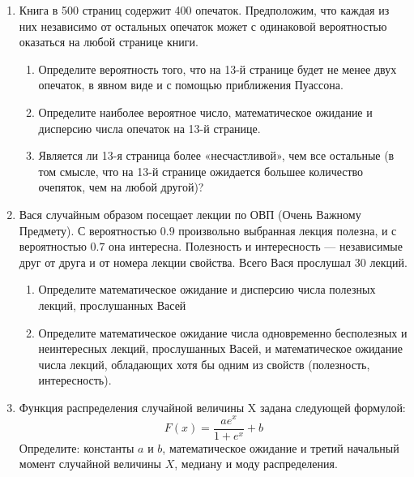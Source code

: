 \begin{enumerate}
\item Книга в 500 страниц содержит 400 опечаток. Предположим, что каждая из них
независимо от остальных опечаток может с одинаковой вероятностью оказаться на любой
странице книги.
\begin{enumerate}
\item Определите вероятность того, что на 13-й странице будет не менее двух опечаток,
в явном виде и с помощью приближения Пуассона.
\item Определите наиболее вероятное число, математическое ожидание и дисперсию
числа опечаток на 13-й странице.
\item Является ли 13-я страница более «несчастливой», чем все остальные (в том
смысле, что на 13-й странице ожидается большее количество очепяток, чем на любой другой)?
\end{enumerate}

\item Вася случайным образом посещает лекции по ОВП (Очень Важному Предмету).
С вероятностью $0.9$ произвольно выбранная лекция полезна, и с вероятностью $0.7$
она интересна. Полезность и интересность — независимые друг от друга и от номера
лекции свойства. Всего Вася прослушал 30 лекций.
\begin{enumerate}
\item Определите математическое ожидание и дисперсию числа полезных лекций,
прослушанных Васей
\item Определите математическое ожидание числа одновременно бесполезных и
неинтересных лекций, прослушанных Васей, и математическое ожидание числа лекций,
обладающих хотя бы одним из свойств (полезность, интересность).
\end{enumerate}
\item Функция распределения случайной величины X задана следующей формулой:
 \[
 F(x)=\frac{ae^x}{1+e^x}+b
 \]
Определите: константы $a$ и $b$, математическое ожидание и третий начальный
момент случайной величины $X$, медиану и моду распределения.


\end{enumerate}

